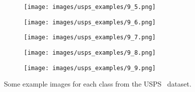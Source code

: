 \begin{figure}[t]
\begin{subfigure}[c]{0.07\textwidth}
  \centering
  \texttt{[image: images/usps\_examples/9\_5.png]}
 \end{subfigure}
 \begin{subfigure}[c]{0.07\textwidth}
  \centering
  \texttt{[image: images/usps\_examples/9\_6.png]}
 \end{subfigure}
 \begin{subfigure}[c]{0.07\textwidth}
  \centering
  \texttt{[image: images/usps\_examples/9\_7.png]}
 \end{subfigure}
 \begin{subfigure}[c]{0.07\textwidth}
  \centering
  \texttt{[image: images/usps\_examples/9\_8.png]}
 \end{subfigure}
 \begin{subfigure}[c]{0.07\textwidth}
  \centering
  \texttt{[image: images/usps\_examples/9\_9.png]}
 \end{subfigure}
 \caption{Some example images for each class from the USPS~\cite{USPS} dataset.}\label{fig:usps_examples}
\end{figure}